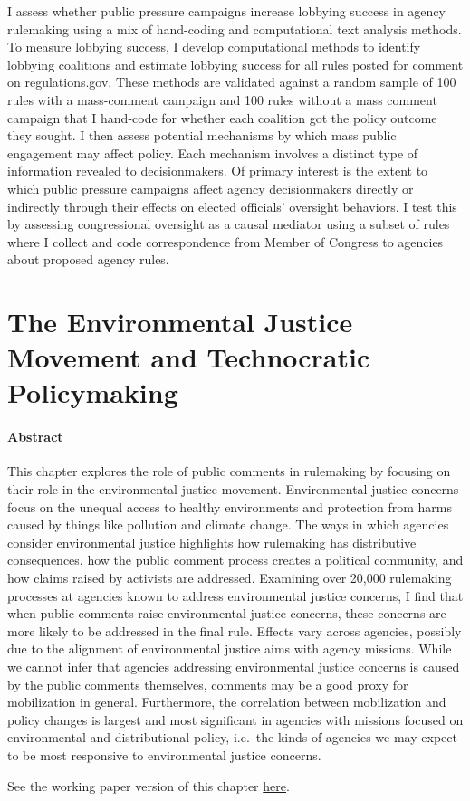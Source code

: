 \documentclass[
]{book}
\begin{document}
I assess whether public pressure campaigns increase lobbying success in agency rulemaking using a mix of hand-coding and computational text analysis methods. To measure lobbying success, I develop computational methods to identify lobbying coalitions and estimate lobbying success for all rules posted for comment on regulations.gov. These methods are validated against a random sample of 100 rules with a mass-comment campaign and 100 rules without a mass comment campaign that I hand-code for whether each coalition got the policy outcome they sought. I then assess potential mechanisms by which mass public engagement may affect policy. Each mechanism involves a distinct type of information revealed to decisionmakers. Of primary interest is the extent to which public pressure campaigns affect agency decisionmakers directly or indirectly through their effects on elected officials' oversight behaviors. I test this by assessing congressional oversight as a causal mediator using a subset of rules where I collect and code correspondence from Member of Congress to agencies about proposed agency rules.

\hypertarget{the-environmental-justice-movement-and-technocratic-policymaking}{%
\chapter{The Environmental Justice Movement and Technocratic Policymaking}\label{the-environmental-justice-movement-and-technocratic-policymaking}}

\hypertarget{abstract-4}{%
\subsubsection*{Abstract}\label{abstract-4}}

This chapter explores the role of public comments in rulemaking by focusing on their role in the environmental justice movement. Environmental justice concerns focus on the unequal access to healthy environments and protection from harms caused by things like pollution and climate change. The ways in which agencies consider environmental justice highlights how rulemaking has distributive consequences, how the public comment process creates a political community, and how claims raised by activists are addressed. Examining over 20,000 rulemaking processes at agencies known to address environmental justice concerns, I find that when public comments raise environmental justice concerns, these concerns are more likely to be addressed in the final rule. Effects vary across agencies, possibly due to the alignment of environmental justice aims with agency missions. While we cannot infer that agencies addressing environmental justice concerns is caused by the public comments themselves, comments may be a good proxy for mobilization in general. Furthermore, the correlation between mobilization and policy changes is largest and most significant in agencies with missions focused on environmental and distributional policy, i.e.~the kinds of agencies we may expect to be most responsive to environmental justice concerns.

See the working paper version of this chapter \href{https://judgelord.github.io/research/ej/}{here}.

  
\end{document}
